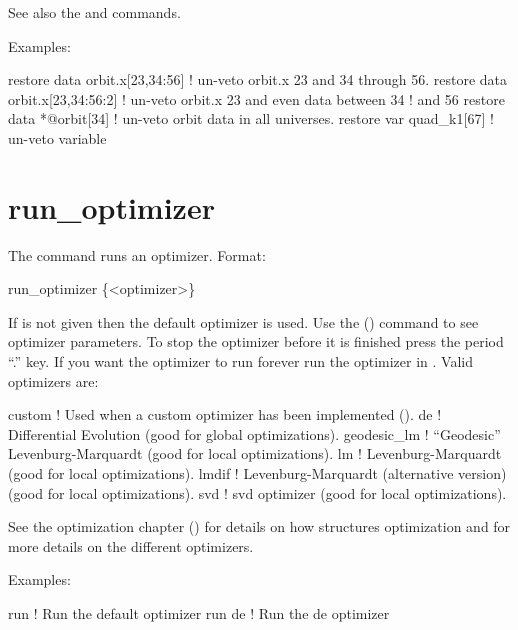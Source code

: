 See also the  and  commands.

Examples:
\begin{example}
  restore data orbit.x[23,34:56]   ! un-veto orbit.x 23 and 34 through 56.
  restore data orbit.x[23,34:56:2] ! un-veto orbit.x 23 and even data between 34 
                                   !                                          and 56
  restore data *@orbit[34]         ! un-veto orbit data in all universes.
  restore var quad_k1[67]          ! un-veto variable
\end{example}

\section{run_optimizer}
\label{s:run}

The  command runs an optimizer. Format:
\begin{example}
  run_optimizer \{<optimizer>\}
\end{example}

\vskip 10pt 

If  is not given then the default optimizer is used.  Use the 
() command to see optimizer parameters.  To stop the optimizer before it is
finished press the period ``.''  key. If you want the optimizer to run forever run the optimizer in
. Valid optimizers are:
\begin{example}
  custom        ! Used when a custom optimizer has been implemented ().
  de            ! Differential Evolution (good for global optimizations).
  geodesic_lm   ! ``Geodesic'' Levenburg-Marquardt (good for local optimizations).
  lm            ! Levenburg-Marquardt (good for local optimizations).
  lmdif         ! Levenburg-Marquardt (alternative version) (good for local optimizations).
  svd           ! svd optimizer (good for local optimizations).
\end{example}

See the optimization chapter () for details on how \tao structures optimization and for
more details on the different optimizers.

Examples:
\begin{example}
  run         ! Run the default optimizer
  run de      ! Run the de optimizer
\end{example}

